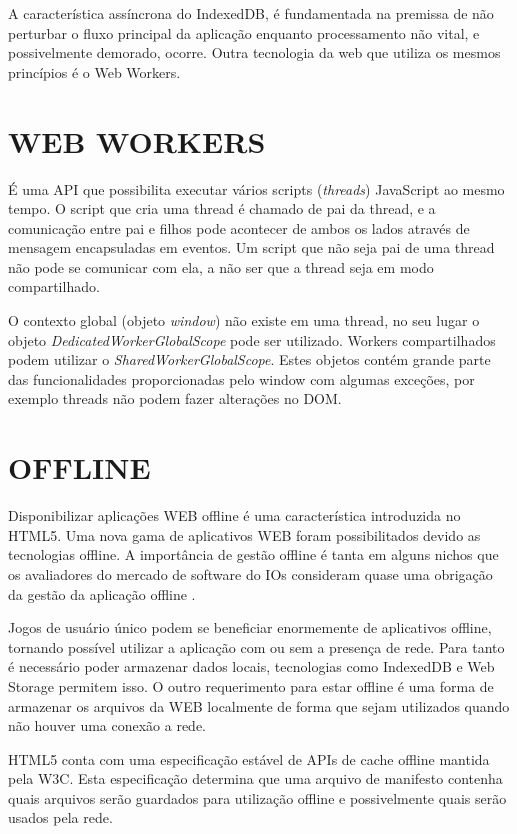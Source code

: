 
A característica assíncrona do IndexedDB, é fundamentada na
premissa de não perturbar o fluxo principal da aplicação enquanto
processamento não vital, e possivelmente demorado, ocorre. Outra
tecnologia da web que utiliza os mesmos princípios é o Web Workers.

\section{WEB WORKERS}

É uma API que possibilita executar vários scripts
(\textit{threads}) JavaScript ao mesmo tempo. O script que cria uma
thread é chamado de pai da thread, e a comunicação entre pai e filhos
pode acontecer de ambos os lados através de mensagem encapsuladas
em eventos. Um script que não seja pai de uma thread não pode se
comunicar com ela, a não ser que a thread seja em modo compartilhado.

O contexto global (objeto \textit{window}) não existe em uma
thread, no seu lugar o objeto \textit{DedicatedWorkerGlobalScope}
pode ser utilizado. Workers compartilhados podem utilizar o
\textit{SharedWorkerGlobalScope}. Estes objetos contém grande parte das
funcionalidades proporcionadas pelo window com algumas exceções, por
exemplo threads não podem fazer alterações no DOM.

\section{OFFLINE}
Disponibilizar aplicações WEB offline é uma característica
introduzida no HTML5. Uma nova gama de aplicativos WEB foram
possibilitados devido as tecnologias offline. A importância de gestão
offline é tanta em alguns nichos que os avaliadores do mercado
de software do IOs consideram quase uma obrigação da gestão da
aplicação offline \autocite{publishHtml5}.

Jogos de usuário único podem se beneficiar enormemente de aplicativos
offline, tornando possível utilizar a aplicação com ou sem a
presença de rede. Para tanto é necessário poder armazenar dados
locais, tecnologias como IndexedDB e Web Storage permitem isso. O outro
requerimento para estar offline é uma forma de armazenar os arquivos
da WEB localmente de forma que sejam utilizados quando não houver uma
conexão a rede.

HTML5 conta com uma especificação estável de APIs de cache offline
mantida pela W3C. Esta especificação determina que uma arquivo de
manifesto contenha quais arquivos serão guardados para utilização
offline e possivelmente quais serão usados pela rede.

